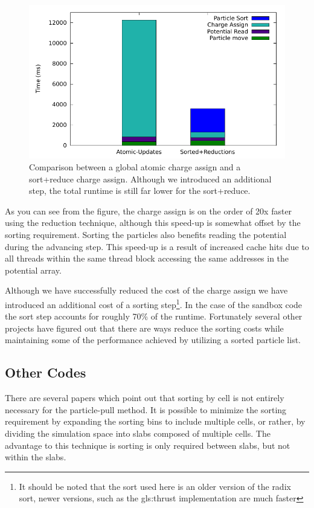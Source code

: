 \begin{figure}
\begin{center}
\includegraphics[width=5in]{design/atomic_vs_sorted.pdf}
\end{center}
\caption[Sandbox GPUPIC Charge Assign Comparison]{Comparison between a global atomic charge assign and a sort+reduce charge assign. Although we introduced an additional step, the total runtime is still far lower for the sort+reduce.}
\label{fig:GPUPIC_comparison}
\end{figure}




As you can see from the figure, the charge assign is on the order of 20x faster using the reduction technique, although this speed-up is somewhat offset by the sorting requirement. Sorting the particles also benefits reading the potential during the advancing step. This speed-up is a result of increased cache hits due to all threads within the same thread block accessing the same addresses in the potential array. 

Although we have successfully reduced the cost of the charge assign we have introduced an additional cost of a sorting step\footnote{It should be noted that the sort used here is an older version of the radix sort, newer versions, such as the \gls{gls:thrust} implementation are much faster}. In the case of the sandbox code the sort step accounts for roughly 70\% of the runtime. Fortunately several other projects have figured out that there are ways reduce the sorting costs while maintaining some of the performance achieved by utilizing a sorted particle list. 

 
		\subsection{Other Codes}
There are several papers which point out that sorting by cell is not entirely necessary for the particle-pull method. It is possible to minimize the sorting requirement by expanding the sorting bins to include multiple cells, or rather, by dividing the simulation space into slabs composed of multiple cells. The advantage to this technique is sorting is only required between slabs, but not within the slabs.\cite{Abreu2011} 

